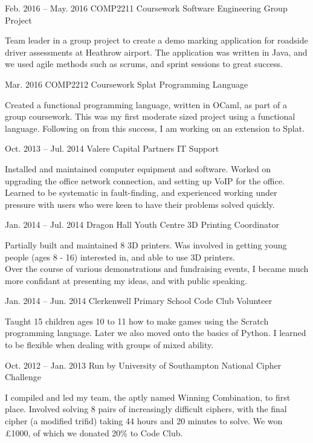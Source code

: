\documentclass{tccv}
\begin{document}
\begin{eventlist}

\item{Feb. 2016 -- May. 2016}
     {COMP2211 Coursework}
     {Software Engineering Group Project}

Team leader in a group project to create a demo marking application for roadside driver assessments at Heathrow airport. The application was written in Java, and we used agile methods such as scrums, and sprint sessions to great success.

\item{Mar. 2016}
     {COMP2212 Coursework}
     {Splat Programming Language}

Created a functional programming language, written in OCaml, as part of a group coursework. This was my first moderate sized project using a functional language. Following on from this success, I am working on an extension to Splat.

\item{Oct. 2013 -- Jul. 2014}
     {Valere Capital Partners}
     {IT Support}

Installed and maintained computer equipment and software. Worked on upgrading the office network connection, and setting up VoIP for the office. Learned to be systematic in fault-finding, and experienced working under pressure with users who were keen to have their problems solved quickly.

\item{Jan. 2014 -- Jul. 2014}
     {Dragon Hall Youth Centre}
     {3D Printing Coordinator}

Partially built and maintained 8 3D printers. Was involved in getting young people (ages 8 - 16) interested in, and able to use 3D printers.\\
Over the course of various demonstrations and fundraising events, I became much more confidant at presenting my ideas, and with public speaking.

\item{Jan. 2014 -- Jun. 2014}
     {Clerkenwell Primary School}
     {Code Club Volunteer}

Taught 15 children ages 10 to 11 how to make games using the Scratch programming language. Later we also moved onto the basics of Python. I learned to be flexible when dealing with groups of mixed ability.

\item{Oct. 2012 -- Jan. 2013}
     {Run by University of Southampton}
     {National Cipher Challenge}
     
I compiled and led my team, the aptly named Winning Combination, to first place. Involved solving 8 pairs of increasingly difficult ciphers, with the final cipher (a modified trifid) taking 44 hours and 20 minutes to solve. We won £1000, of which we donated 20\% to Code Club.

\end{eventlist}
\end{document}
